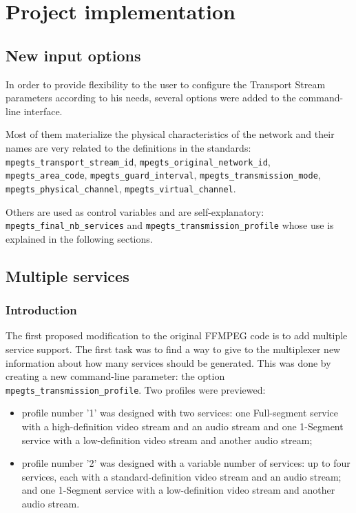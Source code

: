 \documentclass[
	12pt,				%
	openright,			%
	twoside,			%
	a4paper,			%
	brazil,
	french,				%
	english
	]{abntex2}
\begin{document}

\chapter{Project implementation}

\section{New input options}
In order to provide flexibility to the user to configure the Transport Stream parameters according to his needs, several options were added to the command-line interface.

Most of them materialize the physical characteristics of the network and their names are very related to the definitions in the standards: \texttt{mpegts\_transport\_stream\_id}, \texttt{mpegts\_original\_network\_id}, \texttt{mpegts\_area\_code}, \texttt{mpegts\_guard\_interval}, \texttt{mpegts\_transmission\_mode}, \texttt{mpegts\_physical\_channel}, \texttt{mpegts\_virtual\_channel}.

Others are used as control variables and are self-explanatory: \texttt{mpegts\_final\_nb\_services} and  \texttt{mpegts\_transmission\_profile} whose use is explained in the following sections.

\section{Multiple services}

\subsection{Introduction}

The first proposed modification to the original FFMPEG code is to add multiple service support. The first task was to find a way to give to the multiplexer new information about how many services should be generated. This was done by creating a new command-line parameter: the option \texttt{mpegts\_transmission\_profile}. Two profiles were previewed:
\begin{itemize}
\item profile number '1' was designed with two services: one Full-segment service with a high-definition video stream and an audio stream and one 1-Segment service with a low-definition video stream and another audio stream;
\item profile number '2' was designed with a variable number of services: up to four services, each with a standard-definition video stream and an audio stream; and one  1-Segment service with a low-definition video stream and another audio stream.
\end{itemize}
\end{document}
